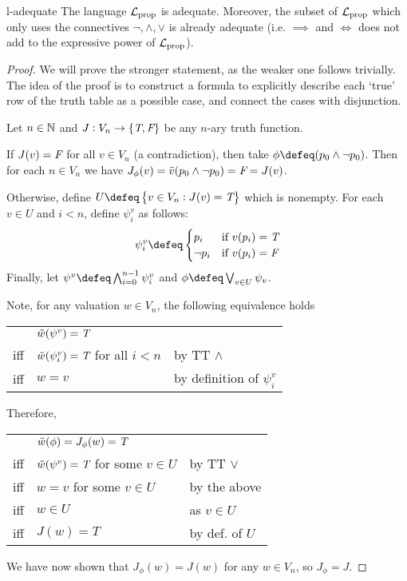 \documentclass{styles/tufte}
\begin{document}
  \begin{theorem}{}{l-adequate}
    The language $\Lprop$ is adequate. Moreover, the subset of $\Lprop$ which only uses the connectives $\neg, \land, \lor$ is already adequate (i.e. $\implies$ and $\iff$ does not add to the expressive power of $\Lprop$).
  \end{theorem}
  \begin{proof}
    We will prove the stronger statement, as the weaker one follows trivially. The idea of the proof is to construct a formula to explicitly describe each `true' row of the truth table as a possible case, and connect the cases with disjunction.
    
    Let $n \in \NN$ and $J: V_n \to \settf$ be any $n$-ary truth function.
    
    If $J(v) = \false$ for all $v \in V_n$ (a contradiction), then take $\phi \defeq (p_0 \land \neg p_0)$. Then for each $n \in V_n$ we have $J_\phi(v) = \val(p_0 \land \neg p_0) = \false = J(v)$.
    
    Otherwise, define $U \defeq \set{v \in V_n: J(v) = \true}$ which is nonempty. For each $v \in U$ and $i < n$, define $\psi^v_i$ as follows:
    \[ \psi^v_i \defeq \begin{cases} p_i &\text{if } v(p_i) = \true \\ \neg p_i &\text{if } v(p_i) = \false  \end{cases} \]
    Finally, let $\psi^v \defeq \conj_{i=0}^{n-1} \psi^v_i$ and $\phi \defeq \disj_{v \in U} \psi_v$.
    
    Note, for any valuation $w \in V_n$, the following equivalence holds
    \begin{center}
    \begin{tabular}{lll}
      & $\val[w](\psi^v) = \true$ & \\
      iff & $\val[w](\psi^v_i) = \true$ for all $i < n$ & by TT $\land$ \\
      iff & $w = v$ & by definition of $\psi^v_i$
    \end{tabular}
    \end{center}
    Therefore,
    \begin{center}
    \begin{tabular}{lll}
      & $\val[w](\phi) = J_\phi(w) = \true$ & \\
      iff & $\val[w](\psi^v) = \true$ for some $v \in U$ & by TT $\lor$ \\
      iff & $w = v$ for some $v \in U$ & by the above \\
      iff & $w \in U$ & as $v \in U$ \\
      iff & $J(w) = T$ & by def. of $U$
    \end{tabular}
    \end{center}
    We have now shown that $J_\phi(w) = J(w)$ for any $w \in V_n$, so $J_\phi = J$.
  \end{proof}
  
\end{document}
